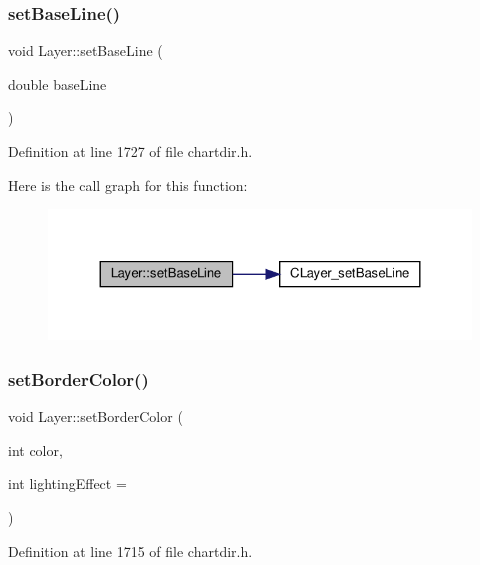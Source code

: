 \subsubsection{\texorpdfstring{set\+Base\+Line()}{setBaseLine()}}
{\footnotesize\ttfamily void Layer\+::set\+Base\+Line (\begin{DoxyParamCaption}\item[{double}]{base\+Line }\end{DoxyParamCaption})\hspace{0.3cm}{\ttfamily [inline]}}



Definition at line 1727 of file chartdir.\+h.

Here is the call graph for this function\+:
\nopagebreak
\begin{figure}[H]
\begin{center}
\leavevmode
\includegraphics[width=324pt]{class_layer_a62eada97375feac765004c6a99095531_cgraph}
\end{center}
\end{figure}
\mbox{\label{class_layer_a5ca95189af8b33edce8e9a6bf28259b1}} 
\subsubsection{\texorpdfstring{set\+Border\+Color()}{setBorderColor()}}
{\footnotesize\ttfamily void Layer\+::set\+Border\+Color (\begin{DoxyParamCaption}\item[{int}]{color,  }\item[{int}]{lighting\+Effect = {} }\end{DoxyParamCaption})\hspace{0.3cm}{\ttfamily [inline]}}



Definition at line 1715 of file chartdir.\+h.

